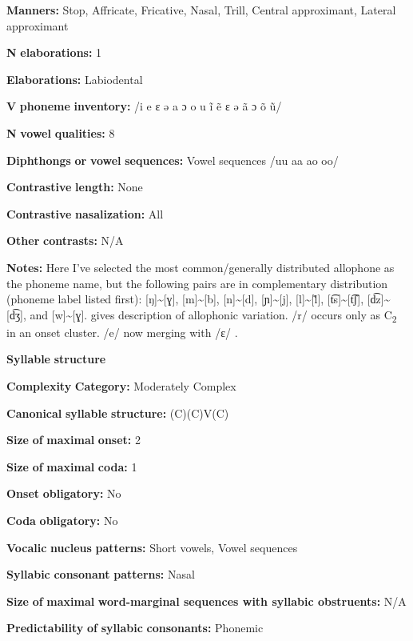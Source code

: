 \textbf{Manners:} Stop, Affricate, Fricative, Nasal, Trill, Central approximant, Lateral approximant

\textbf{N} \textbf{elaborations:} 1

\textbf{Elaborations:} Labiodental

\textbf{V} \textbf{phoneme} \textbf{inventory:} /i e ɛ ə a ɔ o u ĩ ẽ ɛ ə ã ɔ õ ũ/

\textbf{N} \textbf{vowel} \textbf{qualities:} 8

\textbf{Diphthongs} \textbf{or} \textbf{vowel} \textbf{sequences:} Vowel sequences /uu aa ao oo/

\textbf{Contrastive} \textbf{length:} None

\textbf{Contrastive} \textbf{nasalization:} All

\textbf{Other} \textbf{contrasts:} N/A

\textbf{Notes:} Here I’ve selected the most common/generally distributed allophone as the phoneme name, but the following pairs are in complementary distribution (phoneme label listed first): [ŋ]{\textasciitilde}[ɣ], [m]{\textasciitilde}[b], [n]{\textasciitilde}[d], [ɲ]{\textasciitilde}[j], [l]{\textasciitilde}[\~{l}], [t͡s]{\textasciitilde}[t͡ʃ], [d͡z]{\textasciitilde}[d͡ʒ], and [w]{\textasciitilde}[ɣ]. \citet[10-18]{Duthie1996} gives description of allophonic variation. /r/ occurs only as C\textsubscript{2} in an onset cluster. /e/ now merging with /ɛ/ \citep[19]{Duthie1996}.

\textbf{Syllable} \textbf{structure}

\textbf{Complexity} \textbf{Category:} Moderately Complex

\textbf{Canonical} \textbf{syllable} \textbf{structure:} (C)(C)V(C) \citep[38-9]{Ameka1991}

\textbf{Size} \textbf{of} \textbf{maximal} \textbf{onset:} 2

\textbf{Size} \textbf{of} \textbf{maximal} \textbf{coda:} 1

\textbf{Onset} \textbf{obligatory:} No

\textbf{Coda} \textbf{obligatory:} No

\textbf{Vocalic} \textbf{nucleus} \textbf{patterns:} Short vowels, Vowel sequences

\textbf{Syllabic} \textbf{consonant} \textbf{patterns:} Nasal

\textbf{Size} \textbf{of} \textbf{maximal} \textbf{word{}-marginal sequences with syllabic obstruents:} N/A

\textbf{Predictability} \textbf{of} \textbf{syllabic} \textbf{consonants:} Phonemic

